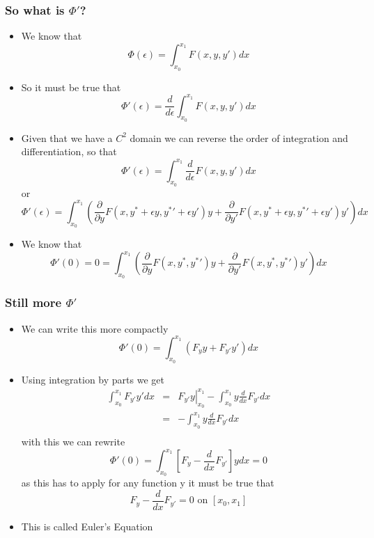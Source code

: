 \documentclass[10pt]{beamer}
\begin{document}
\begin{frame}
  \frametitle{So what is $\Phi'$?}
  \begin{itemize}
  \item We know that
    \[
      \Phi(\epsilon) = \int_{x_0}^{x_1} F(x, y, y{'}) dx
    \]
  \item So it must be true that
    \[
      \Phi'(\epsilon) = \frac{d}{d \epsilon} \int_{x_0}^{x_1} F(x, y, y{'}) dx
    \]
  \item Given that we have a $C^{2}$ domain we can reverse the order of
    integration and differentiation, so that
    \[
      \Phi{'}(\epsilon) =  \int_{x_0}^{x_1} \frac{d}{d \epsilon} F(x, y, y{'}) dx
    \] \pause or
    \[
      \Phi{'}( \epsilon ) =  \int_{x_0}^{x_1} \left(
        \frac{\partial}{\partial y} F(x, y^{*} +  \epsilon y, y^{*}{'}+ \epsilon y{'} ) y +  
        \frac{\partial}{\partial y{'}} F ( x, y^{*} + \epsilon y, y^{*} '+ \epsilon y{'} ) y{'} 
        \right) dx
    \]
  \item We know that
    \[
      \Phi{'}(0) = 0 = \int_{x_0}^{x_1} \left( 
       \frac{\partial}{\partial y}  F ( x, y^{*}, y^{*}{'} ) y + 
       \frac{\partial }{\partial y{'}}  F( x, y^{*} , y^{*}{'} ) y{'} 
       \right)  dx
    \]
  \end{itemize}
\end{frame}

\begin{frame}
  \frametitle{Still more $\Phi'$}
  \begin{itemize}
  \item We can write this more compactly
    \[
      \Phi{'}(0)= \int_{x_0}^{x_1} \left( F_y y + F_{y'} y' \right) dx
    \]
  \item Using integration by parts we get
    \[
      \begin{array}{rcl}
        \int_{x_0}^{x_1} F_{y'} y' dx &=& \left. F_{y'} y \right\vert_{x_0}^{x_1} - \int_{x_0}^{x_1} y \frac{d}{dx} F_{y'} dx\\
        &=& - \int_{x_0}^{x_1} y \frac{d}{dx} F_{y'} dx\\
      \end{array}
    \] with this we can rewrite
    \[
      \Phi{'}(0)= \int_{x_0}^{x_1} \left[ F_y - \frac{d}{dx} F_{y'} \right] y dx = 0
    \] as this has to apply for any function y it must be true that
    \[
      F_y - \frac{d}{dx} F_{y'} = 0 \mbox{ on } [x_0, x_1]
    \]
  \item This is called Euler's Equation
  \end{itemize}
\end{frame}
\end{document}
